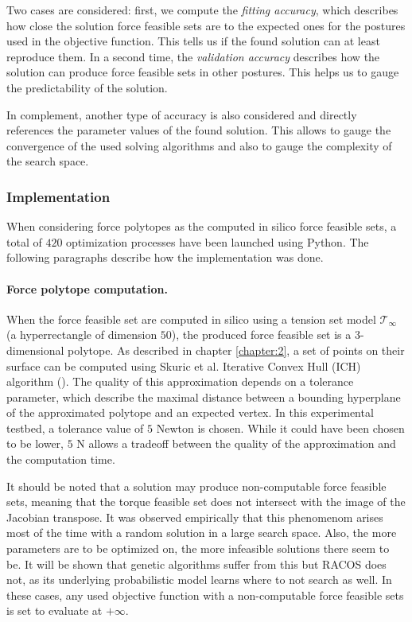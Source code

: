 Two cases are considered: first, we compute the \emph{fitting accuracy}, which describes how close the solution force feasible sets are to the expected ones for the postures used in the objective function. This tells us if the found solution can at least reproduce them. In a second time, the \emph{validation accuracy} describes how the solution can produce force feasible sets in other postures. This helps us to gauge the predictability of the solution.

In complement, another type of accuracy is also considered and directly references the parameter values of the found solution. This allows to gauge the convergence of the used solving algorithms and also to gauge the complexity of the search space.

\subsubsection*{Implementation}
When considering force polytopes as the computed in silico force feasible sets, a total of $420$ optimization processes have been launched using Python. The following paragraphs describe how the implementation was done.

\paragraph*{Force polytope computation.}
When the force feasible set are computed in silico using a tension set model $\mathcal{T}_{\infty}$ (a hyperrectangle of dimension $50$), the produced force feasible set is a 3-dimensional polytope. As described in chapter \ref{chapter:2}, a set of points on their surface can be computed using Skuric et al. Iterative Convex Hull (ICH) algorithm (\cite{skuricOnLineFeasibleWrench2022}). The quality of this approximation depends on a tolerance parameter, which describe the maximal distance between a bounding hyperplane of the approximated polytope and an expected vertex. In this experimental testbed, a tolerance value of $5$ Newton is chosen. While it could have been chosen to be lower, $5$ N allows a tradeoff between the quality of the approximation and the computation time.

It should be noted that a solution may produce non-computable force feasible sets, meaning that the torque feasible set does not intersect with the image of the Jacobian transpose. It was observed empirically that this phenomenom arises most of the time with a random solution in a large search space. Also, the more parameters are to be optimized on, the more infeasible solutions there seem to be. It will be shown that genetic algorithms suffer from this but RACOS does not, as its underlying probabilistic model learns where to not search as well. In these cases, any used objective function with a non-computable force feasible sets is set to evaluate at $+\infty$. 

